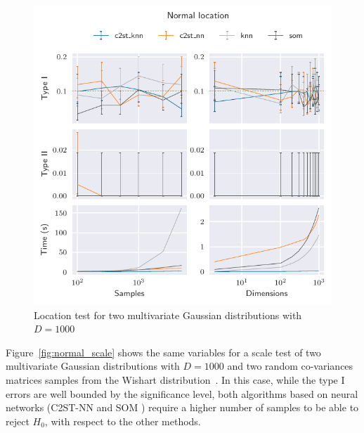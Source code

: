 \begin{figure}[htpb]
    \centering
    \includegraphics{images/6_som/normal_location}
    \caption{
    Location test for two multivariate Gaussian distributions with $D=1000$
    }
    \label{fig:normal_location}
\end{figure}

Figure~\ref{fig:normal_scale} shows the same variables for a scale test of two multivariate
Gaussian distributions with $D=1000$ and two random co-variances matrices samples from the
Wishart distribution~\cite{smith1972algorithm}. In this case, while the type I errors are
well bounded by the significance level, both algorithms based on neural networks
(C2ST-NN and \gls{SOM} ) require a higher number of samples to be able to reject $H_0$, with respect
to the other methods.

